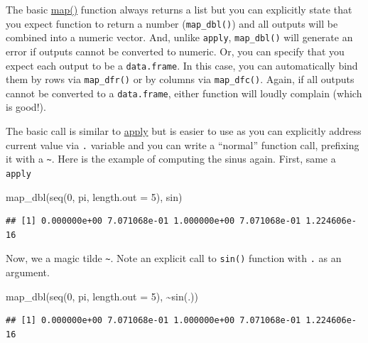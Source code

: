 \documentclass[
]{book}
\newenvironment{Shaded}{\begin{snugshade}}{\end{snugshade}}
\newcommand{\AttributeTok}[1]{\textcolor[rgb]{0.77,0.63,0.00}{#1}}
\newcommand{\DecValTok}[1]{\textcolor[rgb]{0.00,0.00,0.81}{#1}}
\newcommand{\FunctionTok}[1]{\textcolor[rgb]{0.00,0.00,0.00}{#1}}
\newcommand{\NormalTok}[1]{#1}
\newcommand{\SpecialCharTok}[1]{\textcolor[rgb]{0.00,0.00,0.00}{#1}}
\begin{document}
The basic \href{https://purrr.tidyverse.org/reference/map.html}{map()} function always returns a list but you can explicitly state that you expect function to return a number (\texttt{map\_dbl()}) and all outputs will be combined into a numeric vector. And, unlike \texttt{apply}, \texttt{map\_dbl()} will generate an error if outputs cannot be converted to numeric. Or, you can specify that you expect each output to be a \texttt{data.frame}. In this case, you can automatically bind them by rows via \texttt{map\_dfr()} or by columns via \texttt{map\_dfc()}. Again, if all outputs cannot be converted to a \texttt{data.frame}, either function will loudly complain (which is good!).

The basic call is similar to \protect\hyperlink{apply}{apply} but is easier to use as you can explicitly address current value via \texttt{.} variable and you can write a ``normal'' function call, prefixing it with a \texttt{\textasciitilde{}}. Here is the example of computing the sinus again. First, same a \texttt{apply}

\begin{Shaded}
\begin{Highlighting}[]
\FunctionTok{map\_dbl}\NormalTok{(}\FunctionTok{seq}\NormalTok{(}\DecValTok{0}\NormalTok{, pi, }\AttributeTok{length.out =} \DecValTok{5}\NormalTok{), sin)}
\end{Highlighting}
\end{Shaded}

\begin{verbatim}
## [1] 0.000000e+00 7.071068e-01 1.000000e+00 7.071068e-01 1.224606e-16
\end{verbatim}

Now, we a magic tilde \texttt{\textasciitilde{}}. Note an explicit call to \texttt{sin()} function with \texttt{.} as an argument.

\begin{Shaded}
\begin{Highlighting}[]
\FunctionTok{map\_dbl}\NormalTok{(}\FunctionTok{seq}\NormalTok{(}\DecValTok{0}\NormalTok{, pi, }\AttributeTok{length.out =} \DecValTok{5}\NormalTok{), }\SpecialCharTok{\textasciitilde{}}\FunctionTok{sin}\NormalTok{(.))}
\end{Highlighting}
\end{Shaded}

\begin{verbatim}
## [1] 0.000000e+00 7.071068e-01 1.000000e+00 7.071068e-01 1.224606e-16
\end{verbatim}
\end{document}
